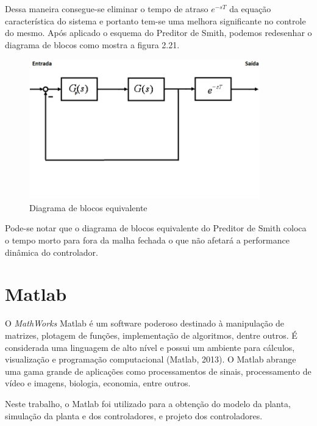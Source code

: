Dessa maneira consegue-se eliminar o tempo de atraso $e^{-sT}$ da equação característica do sistema e portanto tem-se uma melhora significante no controle do mesmo. Após aplicado o esquema do Preditor de Smith, podemos redesenhar o diagrama de blocos como mostra a figura 2.21.

\begin{figure}[!htb]

\center

\includegraphics[width=10cm]{imagens/Preditor_de_smith_equivalente.png}

\label{Diagrama de blocos equivalente}

\caption{Diagrama de blocos equivalente}

\end{figure}

Pode-se notar que o diagrama de blocos equivalente do Preditor de Smith coloca o tempo morto para fora da malha fechada o que não afetará a performance dinâmica do controlador.

\section{Matlab}

O \textit{MathWorks} Matlab é um software poderoso destinado à manipulação de matrizes, plotagem de funções, implementação de algoritmos, dentre outros. É considerada uma linguagem de alto nível e possui um ambiente para cálculos, visualização e programação computacional (Matlab, 2013). O Matlab abrange uma gama grande de aplicações como processamentos de sinais, processamento  de vídeo e imagens, biologia, economia, entre outros.

Neste trabalho, o Matlab  foi utilizado para  a obtenção do modelo da planta, simulação da planta e dos controladores, e projeto dos controladores. 